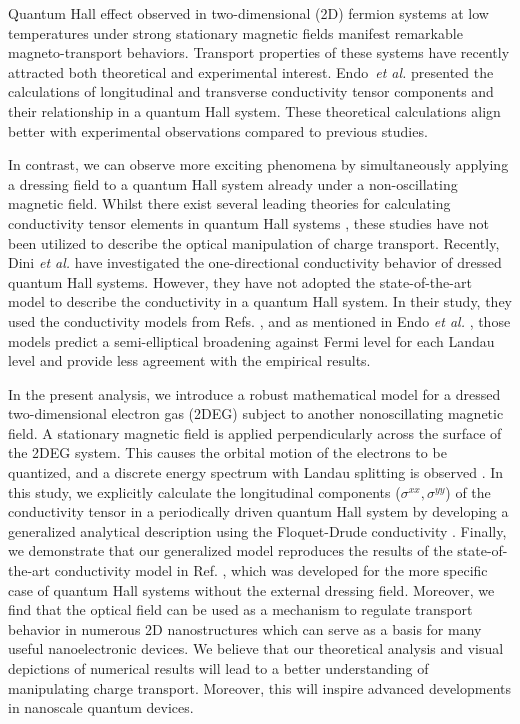 Quantum Hall effect \cite{girvin90} observed in two-dimensional (2D) fermion systems at low temperatures under strong stationary magnetic fields manifest remarkable magneto-transport behaviors. Transport properties of these systems have recently attracted both theoretical \cite{ando72,ando74_1,ando74_2,ando74_3,ando74_4,ando82,endo09} and experimental \cite{allerman95,tieke97,pan05} interest.
Endo \textit{et al.} \cite{endo09} presented the calculations of longitudinal and transverse conductivity tensor components and their relationship in a quantum Hall system. These theoretical calculations  align better with experimental observations compared to previous studies.

In contrast, we can observe more exciting phenomena by simultaneously applying a dressing field to a quantum Hall system already under a non-oscillating magnetic field.
Whilst there exist several leading theories for calculating conductivity tensor elements in quantum Hall systems \cite{ando74_1,ando82,endo09}, these studies  have not been utilized to describe the optical manipulation of charge transport.
Recently, Dini \textit{et al.} \cite{dini16} have investigated the one-directional conductivity behavior of dressed quantum Hall systems. However, they have not adopted the state-of-the-art model to describe the conductivity in a quantum Hall system. In their study, they used the conductivity models from Refs. \cite{ando74_1,ando82}, and as mentioned in Endo \textit{et al.} \cite{endo09}, those models predict a semi-elliptical broadening against Fermi level for each Landau level and provide less agreement with the empirical results.

In the present analysis, we introduce a robust mathematical model for a dressed two-dimensional electron gas (2DEG) subject to another nonoscillating magnetic field.
A stationary magnetic field is applied perpendicularly across the surface of the 2DEG system. This causes the orbital motion of the electrons to be quantized, and a discrete energy spectrum with Landau splitting is observed \cite{landau30}.
In this study, we explicitly calculate the longitudinal components ($\sigma^{xx},\sigma^{yy}$) of the conductivity tensor in a periodically driven quantum Hall system by developing a generalized analytical description using the Floquet-Drude conductivity \cite{wackerl20}.
Finally, we demonstrate that our generalized model reproduces the results of the state-of-the-art conductivity model in Ref. \cite{endo09}, which was developed for the more specific case of quantum Hall systems without the external dressing field.
Moreover, we find that the optical field can be used as a mechanism to regulate transport behavior in numerous 2D nanostructures which can serve as a basis for many useful nanoelectronic devices. We believe that our theoretical analysis and visual depictions of numerical results will lead to a better understanding of manipulating charge transport. Moreover, this will inspire advanced  developments in nanoscale quantum devices.

